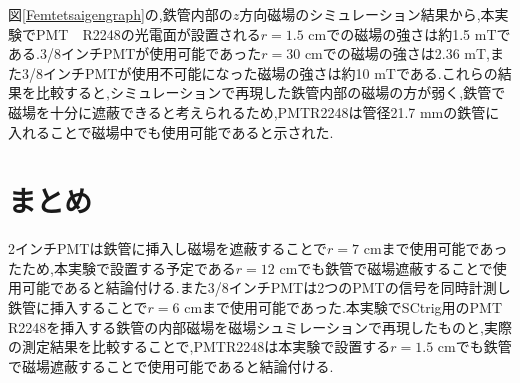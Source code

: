 図\ref{Femtetsaigengraph}の,鉄管内部の$z$方向磁場のシミュレーション結果から,本実験でPMT　R2248の光電面が設置される$r=1.5$ cmでの磁場の強さは約1.5 mTである.3/8インチPMTが使用可能であった$r=30$ cmでの磁場の強さは2.36 mT,また3/8インチPMTが使用不可能になった磁場の強さは約10 mTである.これらの結果を比較すると,シミュレーションで再現した鉄管内部の磁場の方が弱く,鉄管で磁場を十分に遮蔽できると考えられるため,PMT\hspace{3pt}R2248は管径21.7 mmの鉄管に入れることで磁場中でも使用可能であると示された.

\section{まとめ}
2インチPMTは鉄管に挿入し磁場を遮蔽することで$r=7$ cmまで使用可能であったため,本実験で設置する予定である$r=12$ cmでも鉄管で磁場遮蔽することで使用可能であると結論付ける.また3/8インチPMTは2つのPMTの信号を同時計測し鉄管に挿入することで$r=6$ cmまで使用可能であった.本実験でSCtrig用のPMT　R2248を挿入する鉄管の内部磁場を磁場シュミレーションで再現したものと,実際の測定結果を比較することで,PMT\hspace{3pt}R2248は本実験で設置する$r=1.5$ cmでも鉄管で磁場遮蔽することで使用可能であると結論付ける.



